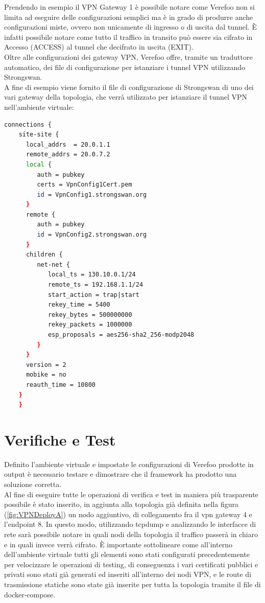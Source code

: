 Prendendo in esempio il VPN Gateway 1 è possibile notare come Verefoo non si limita ad eseguire delle configurazioni semplici ma è in grado di produrre anche configurazioni miste, ovvero non unicamente di ingresso o di uscita dal tunnel. 
È infatti possibile notare come tutto il traffico in transito può essere sia cifrato in Accesso (ACCESS) al tunnel che decifrato in uscita (EXIT).\\
Oltre alle configurazioni dei gateway VPN, Verefoo offre, tramite un traduttore automatico, dei file di configurazione per istanziare i tunnel VPN utilizzando Strongswan.\\
A fine di esempio viene fornito il file di configurazione di Strongswan di uno dei vari gateway della topologia, che verrà utilizzato per istanziare il tunnel VPN nell'ambiente virtuale:\\


\begin{lstlisting}[language=sh]
    connections {
    site-site {
      local_addrs  = 20.0.1.1
      remote_addrs = 20.0.7.2
      local {
         auth = pubkey
         certs = VpnConfig1Cert.pem
         id = VpnConfig1.strongswan.org
      }
      remote {
         auth = pubkey
         id = VpnConfig2.strongswan.org
      }
      children {
         net-net {
            local_ts = 130.10.0.1/24            
            remote_ts = 192.168.1.1/24            
            start_action = trap|start 
            rekey_time = 5400
            rekey_bytes = 500000000
            rekey_packets = 1000000
            esp_proposals = aes256-sha2_256-modp2048
         }
      }
      version = 2
      mobike = no
      reauth_time = 10800
    }
    }
\end{lstlisting}

\section{Verifiche e Test}
Definito l'ambiente virtuale e impostate le configurazioni di Verefoo prodotte in output è necessario testare e dimostrare che il framework ha prodotto una soluzione corretta.\\
Al fine di eseguire tutte le operazioni di verifica e test in maniera più trasparente possibile è stato inserito, in aggiunta alla topologia già definita nella figura (\ref{fig:VPNDeployA})
un nodo aggiuntivo, di collegamento fra il vpn gateway 4 e l'endpoint 8. 
In questo modo, utilizzando tcpdump e analizzando le interfacce di rete sarà possibile notare in quali nodi della topologia il traffico passerà in chiaro e in quali invece verrà cifrato. 
È importante sottolineare come all'interno dell'ambiente virtuale tutti gli elementi sono stati configurati precedentemente per velocizzare le operazioni di testing, di conseguenza i vari certificati pubblici e privati sono stati già generati ed inseriti all'interno dei nodi VPN, e le route di trasmissione statiche sono state già inserite per tutta la topologia tramite il file di docker-compose.\\

